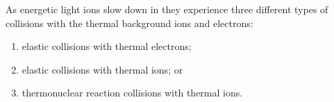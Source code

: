 \documentclass[../main.tex]{subfiles}
\begin{document}
As energetic light ions slow down in they experience three different types of collisions with the thermal background ions and electrons: 
\begin{enumerate}
    \item elastic collisions with thermal electrons;
    \item elastic collisions with thermal ions; or
    \item thermonuclear reaction collisions with thermal ions.
\end{enumerate}








\end{document}
